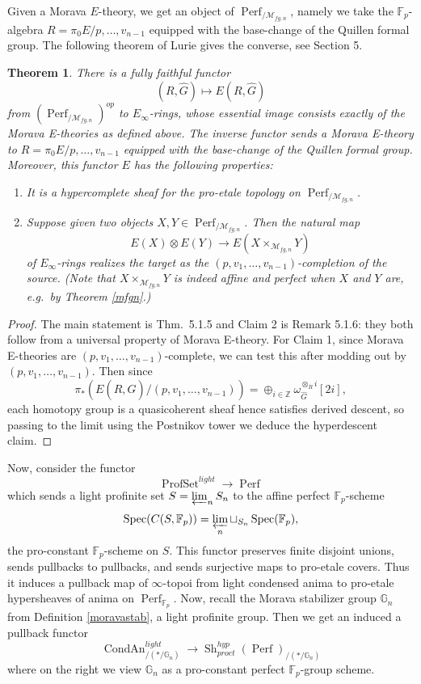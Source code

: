 \documentclass[12pt]{article}
\newtheorem{theorem}{Theorem}[section]
\newcommand{\on}{\operatorname}
\begin{document}
Given a Morava $E$-theory, we get an object of $\on{Perf}_{/\mathcal{M}_{fg,n}}$, namely we take the $\mathbb{F}_p$-algebra $R=\pi_0E/p,\ldots,v_{n-1}$ equipped with the base-change of the Quillen formal group.  The following theorem of Lurie gives the converse, see \cite{LurieE} Section 5.

\begin{theorem}\label{constructe}
There is a fully faithful functor
$$(R,\widehat{G})\mapsto E(R,\widehat{G})$$
from $(\on{Perf}_{/\mathcal{M}_{fg,n}})^{op}$ to $E_\infty$-rings, whose essential image consists exactly of the Morava E-theories as defined above.  The inverse functor sends a Morava E-theory to $R=\pi_0E/p,\ldots,v_{n-1}$ equipped with the base-change of the Quillen formal group.  Moreover, this functor $E$ has the following properties:
\begin{enumerate}
\item It is a hypercomplete sheaf for the pro-etale topology on $\on{Perf}_{/\mathcal{M}_{fg,n}}$.
\item Suppose given two objects $X,Y\in\on{Perf}_{/\mathcal{M}_{fg,n}}$.  Then the natural map
$$E(X)\otimes E(Y)\to E(X\times_{\mathcal{M}_{fg,n}}Y)$$
of $E_\infty$-rings realizes the target as the $(p,v_1,\ldots,v_{n-1})$-completion of the source.  (Note that $X\times_{\mathcal{M}_{fg,n}}Y$ is indeed affine and perfect when $X$ and $Y$ are, e.g.\ by Theorem \ref{mfgn}.)  
\end{enumerate}
\end{theorem}
\begin{proof}
The main statement is \cite{LurieE} Thm.\ 5.1.5 and Claim 2 is \cite{LurieE} Remark 5.1.6: they both follow from a universal property of Morava E-theory.  For Claim 1, since Morava E-theories are $(p,v_1,\ldots,v_{n-1})$-complete, we can test this after modding out by $(p,v_1,\ldots,v_{n-1})$.  Then since
$$\pi_\ast (E(R,\widehat{G})/(p,v_1,\ldots,v_{n-1})) = \oplus_{i\in\mathbb{Z}} \omega_{\widehat{G}}^{\otimes_R i}[2i],$$
each homotopy group is a quasicoherent sheaf hence satisfies derived descent, so passing to the limit using the Postnikov tower we deduce the hyperdescent claim.
\end{proof}

Now, consider the functor
$$\on{ProfSet}^{light}\to\on{Perf}$$
which sends a light profinite set $S=\varprojlim_n S_n$ to the affine perfect $\mathbb{F}_p$-scheme
$$\on{Spec}(C(S,\mathbb{F}_p)) = \varprojlim_n \sqcup_{S_n} \on{Spec}(\mathbb{F}_p),$$
the pro-constant $\mathbb{F}_p$-scheme on $S$.  This functor preserves finite disjoint unions, sends pullbacks to pullbacks, and sends surjective maps to pro-etale covers.   Thus it induces a pullback map of $\infty$-topoi from light condensed anima to pro-etale hypersheaves of anima on $\on{Perf}_{\mathbb{F}_p}$.  Now, recall the Morava stabilizer group $\mathbb{G}_n$ from Definition \ref{moravastab}, a light profinite group.  Then we get an induced a pullback functor
$$\on{CondAn}^{light}_{/(\ast/\mathbb{G}_n)}\to \on{Sh}^{hyp}_{proet}(\on{Perf})_{/(\ast/\mathbb{G}_n)}$$
where on the right we view $\mathbb{G}_n$ as a pro-constant perfect $\mathbb{F}_p$-group scheme.
\end{document}
